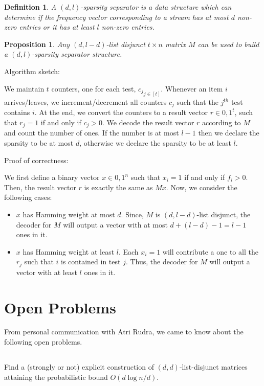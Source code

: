 \documentclass{article}
\newtheorem{proposition}{Proposition}
\newtheorem{definition}{Definition}
\begin{document}
\begin{definition}
  A $(d,l)$-sparsity separator \cite{ganguly2008data} is a data structure
  which can determine if the frequency vector corresponding to a stream has
  at most $d$ non-zero entries or it has at least $l$ non-zero entries.
\end{definition}

\begin{proposition}
  Any $(d,l-d)$-list disjunct $t \times n$ matrix $M$ can be used to build a
  $(d,l)$-sparsity separator structure.\cite{indyk2010efficiently}
\end{proposition}

Algorithm sketch:

We maintain $t$ counters, one for each test, ${c_j}_{j\in[t]}$.
Whenever an item $i$ arrives/leaves, we increment/decrement all counters $c_j$
such that the $j^{th}$ test contains $i$. At the end, we convert the counters
to a result vector $r \in {0,1}^t$, such that $r_j = 1$ if and only if $c_j > 0$.
We decode the result vector $r$ according to $M$ and count the number of ones.
If the number is at most $l-1$ then we declare the sparsity to be at most $d$,
otherwise we declare the sparsity to be at least $l$.

Proof of correctness:

We first define a binary vector $x \in {0,1}^n$ such that $x_i = 1$ if and only if $f_i > 0$.
Then, the result vector $r$ is exactly the same as $Mx$. Now, we consider the following cases:
\begin{itemize}
\item $x$ has Hamming weight at most $d$. Since, $M$ is $(d, l-d)$-list disjunct,
  the decoder for $M$ will output a vector with at most $d + (l-d) - 1 = l - 1$
  ones in it.
\item $x$ has Hamming weight at least $l$. Each $x_i = 1$ will contribute a one to
  all the $r_j$ such that $i$ is contained in test $j$. Thus, the decoder for $M$
  will output a vector with at least $l$ ones in it.
\end{itemize}

\section{Open Problems}

From personal communication with Atri Rudra, we came to know about the following
open problems.

\subsection{}
Find a (strongly or not) explicit construction of $(d,d)$-list-disjunct matrices
attaining the probabilistic bound $O(d\log{n/d})$.
\end{document}
